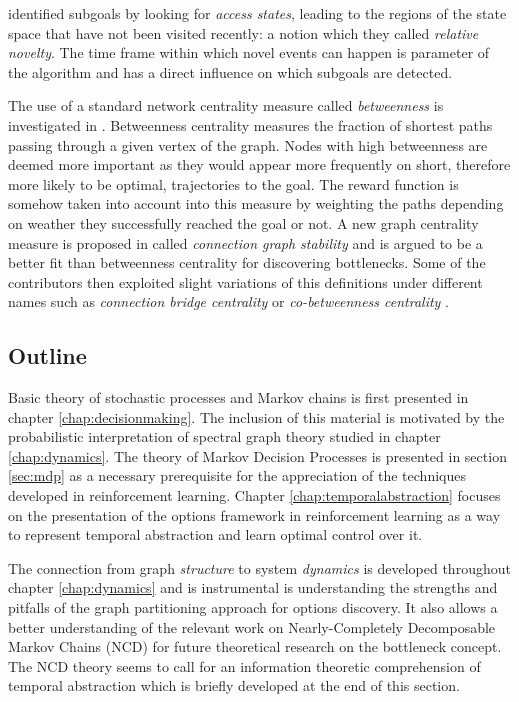 \cite{Simsek2004} identified subgoals by looking for \textit{access states}, leading to the regions of the state space that have not been visited recently: a notion which they called \textit{relative novelty}. The time frame within which novel events can happen is parameter of the algorithm and has a direct influence on which subgoals are detected.

The use of a standard network centrality measure called \textit{betweenness} is investigated in \cite{Simsek2008}. Betweenness centrality measures the fraction of shortest paths passing through a given vertex of the graph. Nodes with high betweenness are deemed more important as they would appear more frequently on short, therefore more likely to be optimal, trajectories to the goal. The reward function is somehow taken into account into this measure by weighting the paths depending on weather they successfully reached the goal or not. A new graph centrality measure is proposed in \cite{Rad2010} called \textit{connection graph stability} and is argued to be a better fit than betweenness centrality for discovering bottlenecks. Some of the contributors then exploited slight variations of this definitions under different names such as \textit{connection bridge centrality} or \textit{co-betweenness centrality} \parencite{Moradi2010}.  

\subsection{Outline}

Basic theory of stochastic processes and Markov chains is first presented in chapter \ref{chap:decisionmaking}. The inclusion of this material is motivated by the probabilistic interpretation of spectral graph theory studied in chapter \ref{chap:dynamics}. The theory of Markov Decision Processes is presented in section \ref{sec:mdp} as a necessary prerequisite for the appreciation of the techniques developed in reinforcement learning. Chapter \ref{chap:temporalabstraction} focuses on the presentation of the options framework \parencite{Sutton1999} in reinforcement learning as a way to represent temporal abstraction and learn optimal control over it.

The connection from graph \textit{structure} to system \textit{dynamics} is developed throughout chapter \ref{chap:dynamics} and is instrumental is understanding the strengths and pitfalls of the graph partitioning approach for options discovery. It also allows a better understanding of the relevant work on Nearly-Completely Decomposable Markov Chains (NCD) for future theoretical research on the bottleneck concept. The NCD theory seems to call for an information theoretic comprehension of temporal abstraction which is briefly developed at the end of this section.

